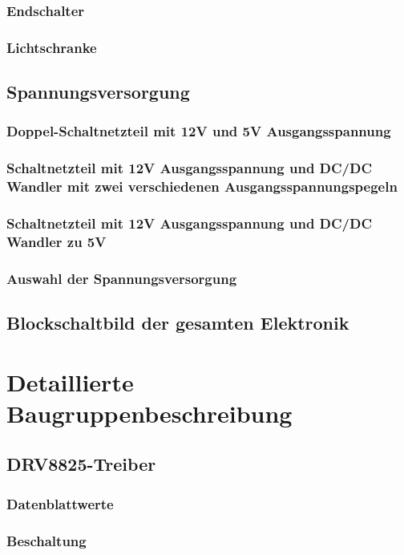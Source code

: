 \subsubsection{Endschalter}
\subsubsection{Lichtschranke}

\subsection{Spannungsversorgung}
\subsubsection{Doppel-Schaltnetzteil mit 12V und 5V Ausgangsspannung}
\subsubsection{Schaltnetzteil mit 12V Ausgangsspannung und DC/DC Wandler mit zwei verschiedenen Ausgangsspannungspegeln}
\subsubsection{Schaltnetzteil mit 12V Ausgangsspannung und DC/DC Wandler zu 5V}
\subsubsection{Auswahl der Spannungsversorgung}

\subsection{Blockschaltbild der gesamten Elektronik}

\section{Detaillierte Baugruppenbeschreibung}

\subsection{DRV8825-Treiber}
\subsubsection{Datenblattwerte}
\subsubsection{Beschaltung}
